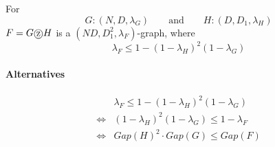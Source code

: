 \documentclass[11pt, letter]{book}
\newcommand*\tcircle[1]{%
  \raisebox{-0.5pt}{%
    \textcircled{#1}%
  }%
}
\begin{document}
\begin{theorem}
	\label{thm:rozenmann vadhan 05 rvw 01}
	For 
	\begin{equation}
		G: (N, D, \lambda_G) \quad \quad 
		\text{and} \quad \quad H : (D, D_1, \lambda_H)
	\end{equation}
	$F = G \tcircle {z} H$ is a $(ND, D_1^2, \lambda_F)$-graph, where 
	\begin{equation}
		\lambda_F \leq 1 - (1 - \lambda_H) ^2 (1 - \lambda_G) 
	\end{equation}
	
	\paragraph{Alternatives} 
	\begin{align}
		& \lambda_F \leq 1 - (1 - \lambda_H) ^2 (1 - \lambda_G) \\
		\iff & (1 - \lambda_H)^2 (1 - \lambda_G) \leq 1 - \lambda_F \\
		\iff & Gap(H)^2 \cdot Gap(G) \leq Gap(F)
	\end{align}
\end{theorem}
\end{document}
